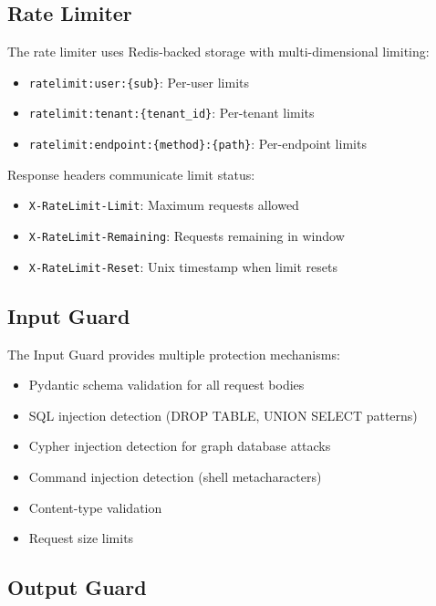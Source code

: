 \documentclass[a4paper,twoside]{sapthesis}
\begin{document}
\subsection{Rate Limiter}
\label{subsec:rate-limiter}

The rate limiter uses Redis-backed storage with multi-dimensional limiting:

\begin{itemize}
    \item \texttt{ratelimit:user:\{sub\}}: Per-user limits
    \item \texttt{ratelimit:tenant:\{tenant\_id\}}: Per-tenant limits
    \item \texttt{ratelimit:endpoint:\{method\}:\{path\}}: Per-endpoint limits
\end{itemize}

Response headers communicate limit status:
\begin{itemize}
    \item \texttt{X-RateLimit-Limit}: Maximum requests allowed
    \item \texttt{X-RateLimit-Remaining}: Requests remaining in window
    \item \texttt{X-RateLimit-Reset}: Unix timestamp when limit resets
\end{itemize}

\subsection{Input Guard}
\label{subsec:input-guard}

The Input Guard provides multiple protection mechanisms:

\begin{itemize}
    \item Pydantic schema validation for all request bodies
    \item SQL injection detection (DROP TABLE, UNION SELECT patterns)
    \item Cypher injection detection for graph database attacks
    \item Command injection detection (shell metacharacters)
    \item Content-type validation
    \item Request size limits
\end{itemize}

\subsection{Output Guard}
\label{subsec:output-guard}
\end{document}
